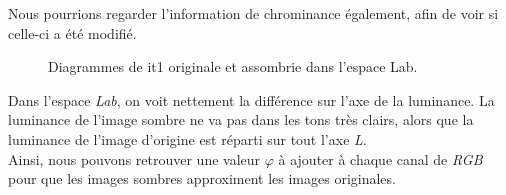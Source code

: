 \documentclass[a4paper,11pt]{article}
\begin{document}
Nous pourrions regarder l'information de chrominance également, 
afin de voir si celle-ci a été modifié.\\

\begin{figure}[H]
  \begin{center}  
    \caption{Diagrammes de it1 originale et assombrie dans l'espace Lab.}
  \end{center}
\end{figure}

Dans l'espace \textit{Lab}, on voit nettement la différence sur l'axe 
de la luminance. La luminance de l'image sombre ne va pas dans les 
tons très clairs, alors que la luminance de l'image d'origine est 
réparti sur tout l'axe \textit{L}.\\

Ainsi, nous pouvons retrouver une valeur $\varphi$ à ajouter à chaque 
canal de \textit{RGB} pour que les images sombres approximent les images
originales.
\end{document}
